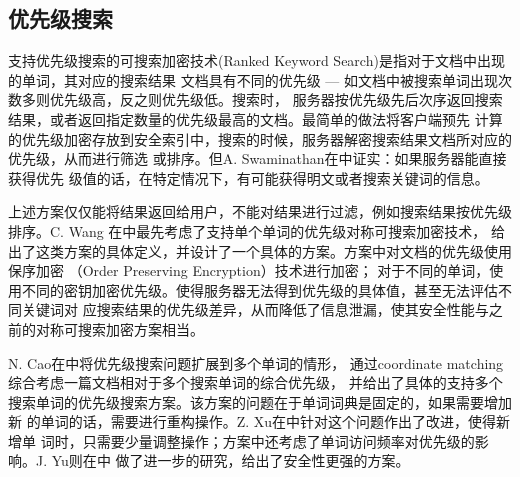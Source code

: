 \subsection{优先级搜索}
\label{sec:search__symm_symm_ranked}
支持优先级搜索的可搜索加密技术(Ranked Keyword Search)是指对于文档中出现的单词，其对应的搜索结果
文档具有不同的优先级 --- 如文档中被搜索单词出现次数多则优先级高，反之则优先级低。搜索时，
服务器按优先级先后次序返回搜索结果，或者返回指定数量的优先级最高的文档。最简单的做法将客户端预先
计算的优先级加密存放到安全索引中，搜索的时候，服务器解密搜索结果文档所对应的优先级，从而进行筛选
或排序。但A. Swaminathan在\cite{swaminathan2007confidentiality}中证实：如果服务器能直接获得优先
级值的话，在特定情况下，有可能获得明文或者搜索关键词的信息。

上述方案仅仅能将结果返回给用户，不能对结果进行过滤，例如搜索结果按优先级排序。C. Wang
在\cite{wang2010secure}\cite{wang2012enabling}中最先考虑了支持单个单词的优先级对称可搜索加密技术，
给出了这类方案的具体定义，并设计了一个具体的方案。方案中对文档的优先级使用保序加密
（Order Preserving Encryption）\cite{boldyreva2011order}技术进行加密；
对于不同的单词，使用不同的密钥加密优先级。使得服务器无法得到优先级的具体值，甚至无法评估不同关键词对
应搜索结果的优先级差异，从而降低了信息泄漏，使其安全性能与之前的对称可搜索加密方案相当。

N. Cao在\cite{cao2014privacy}中将优先级搜索问题扩展到多个单词的情形，
通过coordinate matching\cite{witten1999managing}综合考虑一篇文档相对于多个搜索单词的综合优先级，
并给出了具体的支持多个搜索单词的优先级搜索方案。该方案的问题在于单词词典是固定的，如果需要增加新
的单词的话，需要进行重构操作。Z. Xu在\cite{xu2012efficient}中针对这个问题作出了改进，使得新增单
词时，只需要少量调整操作；方案中还考虑了单词访问频率对优先级的影响。J. Yu则在\cite{cao2014privacy}中
做了进一步的研究，给出了安全性更强的方案。

